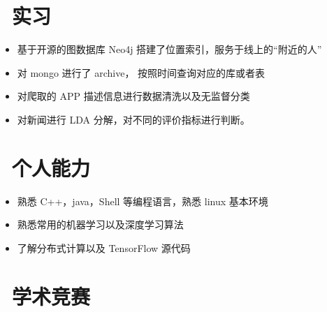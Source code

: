 \documentclass{resume}
\begin{document}
\section{\faUsers\ 实习}
\begin{itemize}
  \item 基于开源的图数据库 Neo4j 搭建了位置索引，服务于线上的“附近的人”
  \item 对 mongo 进行了 archive， 按照时间查询对应的库或者表
\end{itemize}

\begin{itemize}
  \item 对爬取的 APP 描述信息进行数据清洗以及无监督分类
  \item 对新闻进行 LDA 分解，对不同的评价指标进行判断。
\end{itemize}


\section{\faCogs\ 个人能力}
\begin{itemize}[parsep=0.5ex]
  \item 熟悉 C++，java，Shell 等编程语言，熟悉 linux 基本环境
  \item 熟悉常用的机器学习以及深度学习算法
  \item 了解分布式计算以及 TensorFlow 源代码
\end{itemize}

\section{\faTrophy\ 学术竞赛}
%
%
\end{document}
